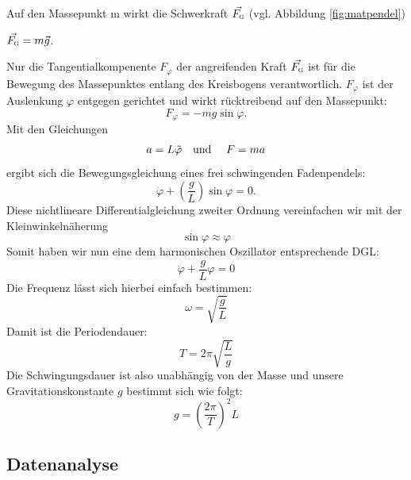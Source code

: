 \documentclass[11pt,a4paper,titlepage, ngerman]{article}
\begin{document}
			Auf den Massepunkt m wirkt die Schwerkraft $ \vec{F_\textsc{g}}$ (vgl. Abbildung \ref{fig:matpendel})
			\begin{center}
				{ $ \vec{F_\textsc{g}} = m\vec{g}$}.
			\end{center}
			Nur die Tangentialkompenente $F_\varphi$ der angreifenden Kraft $ \vec{F_\textsc{g}}$ ist für die Bewegung des Massepunktes entlang des Kreisbogens verantwortlich.   	
			$F_\varphi$ ist der Auslenkung $\varphi$ entgegen gerichtet und wirkt  rücktreibend auf den Massepunkt:
			\begin{equation*}  
				F_\varphi = - m g \sin\varphi.
			\end{equation*}
			Mit den Gleichungen 
			\begin{equation*}
				a = L \ddot{\varphi} \text{\quad und \quad} F = ma
			\end{equation*}
			ergibt sich die Bewegungsgleichung eines frei schwingenden Fadenpendels: 
			\begin{equation*}
				\ddot{\varphi}+\left( \frac{g}{L}\right)  \sin \varphi = 0.
			\end{equation*}
			Diese nichtlineare Differentialgleichung zweiter Ordnung vereinfachen wir mit der Kleinwinkelnäherung
			\begin{equation*}
				\sin \varphi \approx \varphi
			\end{equation*} 
			Somit haben wir nun eine dem harmonischen Oszillator entsprechende DGL:
			\begin{equation*}
				\ddot{\varphi}+\frac{g}{L} \varphi = 0	
			\end{equation*}
			Die Frequenz lässt sich hierbei einfach bestimmen: 
			\begin{equation*}
				\omega =  \sqrt{\frac{g}{L}}
			\end{equation*}
			Damit ist die Periodendauer:
			\begin{equation*}
				T =  2\pi \sqrt{\frac{L}{g}}
			\end{equation*} 
			Die Schwingungsdauer ist also unabhängig von der Masse und unsere Gravitationskonstante $g$ bestimmt sich wie folgt:
			\begin{equation}
				\label{eq:g}
				g = \left(\frac{2 \pi}{T}\right)^2 L
			\end{equation} 
		
		\subsection{Datenanalyse}
		\label{Auswertung}	
	
\end{document}
